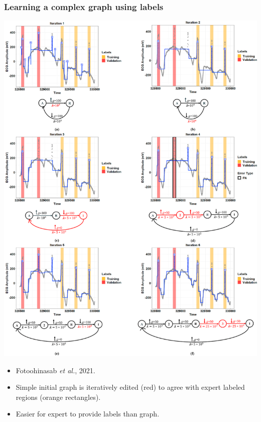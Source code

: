 \documentclass{beamer}
\begin{document}
\begin{frame}
  \frametitle{Learning a complex graph using labels}
\parbox{0.6\textwidth}{
  \includegraphics[width=\linewidth]{gfpop-ecg-iterations}
} \parbox{0.35\textwidth}{
  \begin{itemize}
  \item  Fotoohinasab \emph{et al.}, 2021.
\item Simple initial graph is iteratively edited (red) to agree with expert
 labeled regions (orange rectangles).
\item Easier for expert to provide labels than graph.
  \end{itemize}
 }
\end{frame}
\end{document}
